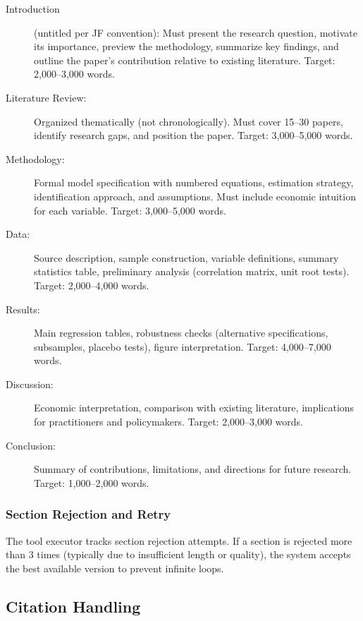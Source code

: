 \begin{description}
  \item[Introduction] (untitled per JF convention): Must present the research question, motivate its importance, preview the methodology, summarize key findings, and outline the paper's contribution relative to existing literature. Target: 2,000--3,000 words.

  \item[Literature Review:] Organized thematically (not chronologically). Must cover 15--30 papers, identify research gaps, and position the paper. Target: 3,000--5,000 words.

  \item[Methodology:] Formal model specification with numbered equations, estimation strategy, identification approach, and assumptions. Must include economic intuition for each variable. Target: 3,000--5,000 words.

  \item[Data:] Source description, sample construction, variable definitions, summary statistics table, preliminary analysis (correlation matrix, unit root tests). Target: 2,000--4,000 words.

  \item[Results:] Main regression tables, robustness checks (alternative specifications, subsamples, placebo tests), figure interpretation. Target: 4,000--7,000 words.

  \item[Discussion:] Economic interpretation, comparison with existing literature, implications for practitioners and policymakers. Target: 2,000--3,000 words.

  \item[Conclusion:] Summary of contributions, limitations, and directions for future research. Target: 1,000--2,000 words.
\end{description}

\subsubsection{Section Rejection and Retry}

The tool executor tracks section rejection attempts.
If a section is rejected more than 3 times (typically due to insufficient length or quality), the system accepts the best available version to prevent infinite loops.

\subsection{Citation Handling}

